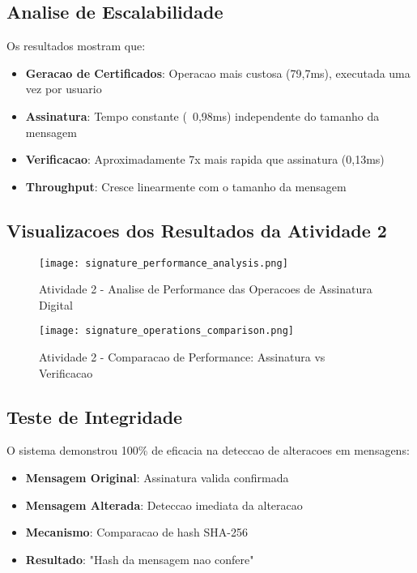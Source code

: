 \documentclass[12pt,a4paper,oneside]{article}
\begin{document}
\subsection{Analise de Escalabilidade}

Os resultados mostram que:

\begin{itemize}
    \item \textbf{Geracao de Certificados}: Operacao mais custosa (79,7ms), executada uma vez por usuario
    \item \textbf{Assinatura}: Tempo constante (~0,98ms) independente do tamanho da mensagem
    \item \textbf{Verificacao}: Aproximadamente 7x mais rapida que assinatura (0,13ms)
    \item \textbf{Throughput}: Cresce linearmente com o tamanho da mensagem
\end{itemize}

\subsection{Visualizacoes dos Resultados da Atividade 2}

\begin{figure}[H]
\centering
\texttt{[image: signature\_performance\_analysis.png]}
\caption{Atividade 2 - Analise de Performance das Operacoes de Assinatura Digital}
\label{fig:signature_performance}
\end{figure}

\begin{figure}[H]
\centering
\texttt{[image: signature\_operations\_comparison.png]}
\caption{Atividade 2 - Comparacao de Performance: Assinatura vs Verificacao}
\label{fig:signature_comparison}
\end{figure}

\subsection{Teste de Integridade}

O sistema demonstrou 100\% de eficacia na deteccao de alteracoes em mensagens:

\begin{itemize}
    \item \textbf{Mensagem Original}: Assinatura valida confirmada
    \item \textbf{Mensagem Alterada}: Deteccao imediata da alteracao
    \item \textbf{Mecanismo}: Comparacao de hash SHA-256
    \item \textbf{Resultado}: "Hash da mensagem nao confere"
\end{itemize}
\end{document}

